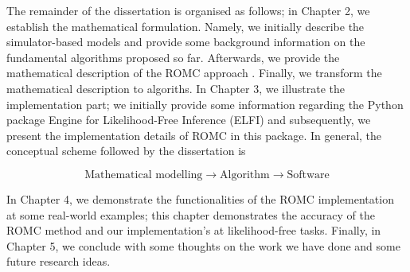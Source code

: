 The remainder of the dissertation is organised as follows; in Chapter
2, we establish the mathematical formulation. Namely, we initially
describe the simulator-based models and provide some background
information on the fundamental algorithms proposed so far. Afterwards,
we provide the mathematical description of the ROMC approach
\autocite{Ikonomov2019}. Finally, we transform the mathematical
description to algoriths. In Chapter 3, we illustrate the
implementation part; we initially provide some information regarding
the Python package Engine for Likelihood-Free Inference (ELFI)
\autocite{1708.00707} and subsequently, we present the implementation
details of ROMC in this package. In general, the conceptual scheme
followed by the dissertation is

$$\text{Mathematical modelling} \rightarrow
\text{Algorithm} \rightarrow \text{Software}$$

In Chapter 4, we demonstrate the functionalities of the ROMC
implementation at some real-world examples; this chapter demonstrates
the accuracy of the ROMC method and our implementation's at
likelihood-free tasks. Finally, in Chapter 5, we conclude with some
thoughts on the work we have done and some future research ideas.